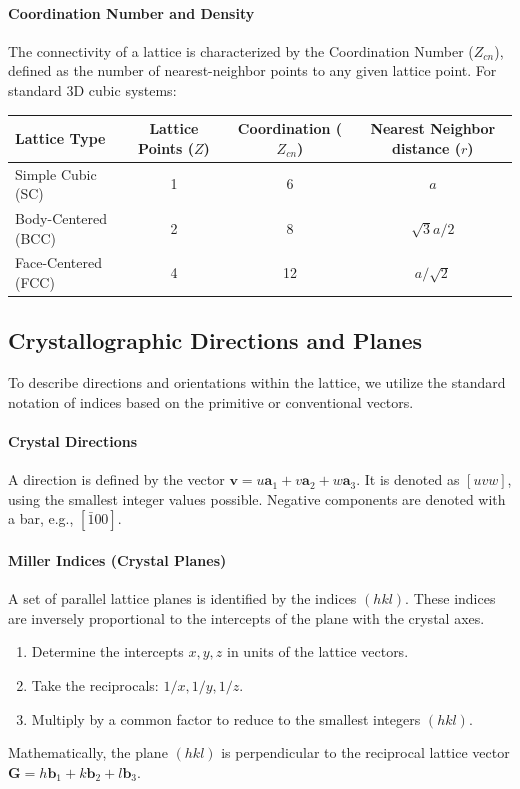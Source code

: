\documentclass[10pt, a4paper]{article}
\begin{document}
\paragraph{Coordination Number and Density}
The connectivity of a lattice is characterized by the Coordination Number ($Z_{cn}$), defined as the number of nearest-neighbor points to any given lattice point. For standard 3D cubic systems:

\begin{center}
\begin{tabular}{|l|c|c|c|}
\hline
\textbf{Lattice Type} & \textbf{Lattice Points ($Z$)} & \textbf{Coordination ($Z_{cn}$)} & \textbf{Nearest Neighbor distance ($r$)} \\ \hline
Simple Cubic (SC) & 1 & 6 & $a$ \\ \hline
Body-Centered (BCC) & 2 & 8 & $\sqrt{3}a/2$ \\ \hline
Face-Centered (FCC) & 4 & 12 & $a/\sqrt{2}$ \\ \hline
\end{tabular}
\end{center}

\subsection{Crystallographic Directions and Planes}

To describe directions and orientations within the lattice, we utilize the standard notation of indices based on the primitive or conventional vectors.

\paragraph{Crystal Directions}
A direction is defined by the vector $\mathbf{v} = u\mathbf{a}_1 + v\mathbf{a}_2 + w\mathbf{a}_3$. It is denoted as $[uvw]$, using the smallest integer values possible. Negative components are denoted with a bar, e.g., $[\bar{1}00]$.

\paragraph{Miller Indices (Crystal Planes)}
A set of parallel lattice planes is identified by the indices $(hkl)$. These indices are inversely proportional to the intercepts of the plane with the crystal axes.
\begin{enumerate}
    \item Determine the intercepts $x, y, z$ in units of the lattice vectors.
    \item Take the reciprocals: $1/x, 1/y, 1/z$.
    \item Multiply by a common factor to reduce to the smallest integers $(hkl)$.
\end{enumerate}
Mathematically, the plane $(hkl)$ is perpendicular to the reciprocal lattice vector $\mathbf{G} = h\mathbf{b}_1 + k\mathbf{b}_2 + l\mathbf{b}_3$.
\end{document}
